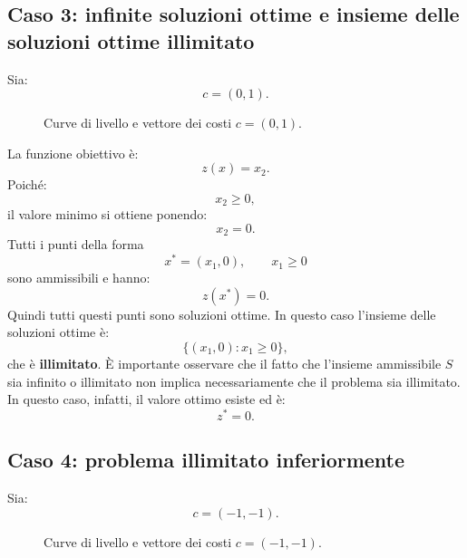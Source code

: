 \subsection{Caso 3: infinite soluzioni ottime e insieme delle soluzioni ottime illimitato} Sia: \[ c=(0,1). \]
\begin{figure}[h]
\centering
{}
\caption{Curve di livello e vettore dei costi $c=(0,1)$.}
\end{figure}


La funzione obiettivo è: \[ z(x)=x_2. \] Poiché: \[ x_2\geq0, \] il valore minimo si ottiene ponendo: \[ x_2=0. \] Tutti i punti della forma \[ \boxed{ x^*=(x_1,0),\qquad x_1\geq0 } \] sono ammissibili e hanno: \[ z(x^*)=0. \] Quindi tutti questi punti sono soluzioni ottime. In questo caso l'insieme delle soluzioni ottime è: \[ \{(x_1,0):x_1\geq0\}, \] che è \textbf{illimitato}. È importante osservare che il fatto che l'insieme ammissibile $S$ sia infinito o illimitato non implica necessariamente che il problema sia illimitato. In questo caso, infatti, il valore ottimo esiste ed è: \[ \boxed{z^*=0}. \] 
\subsection{Caso 4: problema illimitato inferiormente} Sia: \[ c=(-1,-1). \] 
\begin{figure}[h]
\centering
{}
\caption{Curve di livello e vettore dei costi $c=(-1,-1)$.}
\end{figure}

